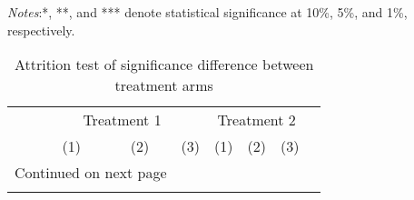 \documentclass[10pt,a4paper]{article}
\begin{document}
\pagebreak

\begin{center}
	{\tiny \tabcolsep=1pt  %
		\begin{ThreePartTable}
			\begin{TableNotes}[flushleft]
				\tiny
				\item \textit{Notes}:*, **, and *** denote statistical significance at 10\%, 5\%, and 1\%, respectively.
			\end{TableNotes}
			\begin{longtable}{l*{7}{c}}
				\caption{Attrition test of significance difference between treatment arms}\label{tab:attrition_cash}					\\
				\toprule
				\hline 
				\multicolumn{1}{c}{}&
				\multicolumn{3}{c}{Treatment 1}&
				\multicolumn{3}{c}{Treatment 2}& \\
				\cmidrule(r){2-4}\cmidrule(r){5-7}
				& {(1)} & {(2)} & {(3)} & {(1)} & {(2)} & {(3)} \\ 
				\hline 
				\endfirsthead
				\hline
				\endhead
				\hline
				\multicolumn{3}{r}{{Continued on next page}} \\
				\endfoot
				
				\bottomrule
				\insertTableNotes
				\endlastfoot
				
			\end{longtable}
		\end{ThreePartTable}
	}
\end{center}
\end{document}
